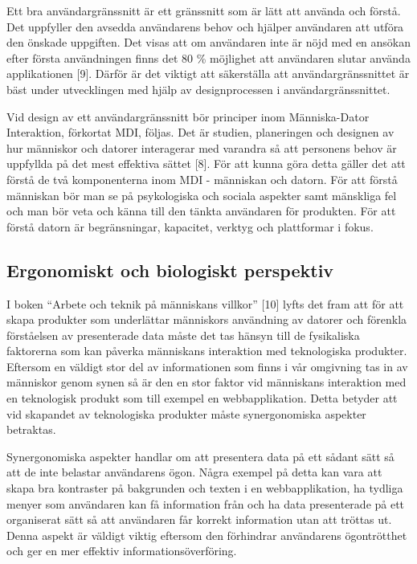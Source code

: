 \documentclass[12pt]{kththesis}
\begin{document}
Ett bra användargränssnitt är ett gränssnitt som är lätt att använda och förstå. Det uppfyller den avsedda användarens behov och hjälper användaren att utföra den önskade uppgiften. Det visas att om användaren inte är nöjd med en ansökan efter första användningen finns det 80 \% möjlighet att användaren slutar använda applikationen [9]. Därför är det viktigt att säkerställa att användargränssnittet är bäst under utvecklingen med hjälp av designprocessen i användargränssnittet.

Vid design av ett användargränssnitt bör principer inom Människa-Dator Interaktion, förkortat MDI, följas. Det är studien, planeringen och designen av hur människor och datorer interagerar med varandra så att personens behov är uppfyllda på det mest effektiva sättet [8]. För att kunna göra detta gäller det att förstå de två komponenterna inom MDI - människan och datorn. För att förstå människan bör man se på psykologiska och sociala aspekter samt mänskliga fel och man bör veta och känna till den tänkta användaren för produkten. För att förstå datorn är begränsningar, kapacitet, verktyg och plattformar i fokus.

\subsection{Ergonomiskt och biologiskt perspektiv}

I boken “Arbete och teknik på människans villkor” [10] lyfts det fram att för att skapa produkter som underlättar människors användning av datorer och förenkla förståelsen av presenterade data måste det tas hänsyn till de fysikaliska faktorerna som kan påverka människans interaktion med teknologiska produkter. Eftersom en väldigt stor del av informationen som finns i vår omgivning tas in av människor genom synen så är den en stor faktor vid människans interaktion med en teknologisk produkt som till exempel en webbapplikation. Detta betyder att vid skapandet av teknologiska produkter måste synergonomiska aspekter betraktas. 

Synergonomiska aspekter handlar om att presentera data på ett sådant sätt så att de inte belastar användarens ögon. Några exempel på detta kan vara att skapa bra kontraster på bakgrunden och texten i en webbapplikation, ha tydliga menyer som användaren kan få information från och ha data presenterade på ett organiserat sätt så att användaren får korrekt information utan att tröttas ut. Denna aspekt är väldigt viktig eftersom den förhindrar användarens ögontrötthet och ger en mer effektiv informationsöverföring. 
\end{document}
